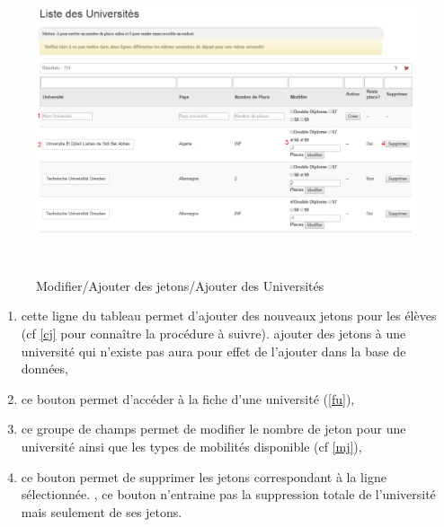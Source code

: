   \begin{figure}[H]
  	\centering
  	
  	\includegraphics[width=16cm,height=9cm]{Images/Admin/gestion_univ_admin.png}
  	\caption{Modifier/Ajouter des jetons/Ajouter des Universités}
  	
  \end{figure}
   \begin{enumerate}
   	\item cette ligne du tableau permet d'ajouter des nouveaux jetons pour les élèves (cf \ref{cj} pour connaître la procédure à suivre). \att ajouter des jetons à une université qui n'existe pas aura pour effet de l'ajouter dans la base de données,
   	\item ce bouton permet d'accéder à la fiche d'une université (\ref{fu}), 
   	\item ce groupe de champs permet de modifier le nombre de jeton pour une université ainsi que les types de mobilités disponible (cf \ref{mj}),
   	\item ce bouton permet de supprimer les jetons correspondant à la ligne sélectionnée. \att, ce bouton n'entraine pas la suppression totale de l'université mais seulement de ses jetons.
   \end{enumerate}

\newpage
